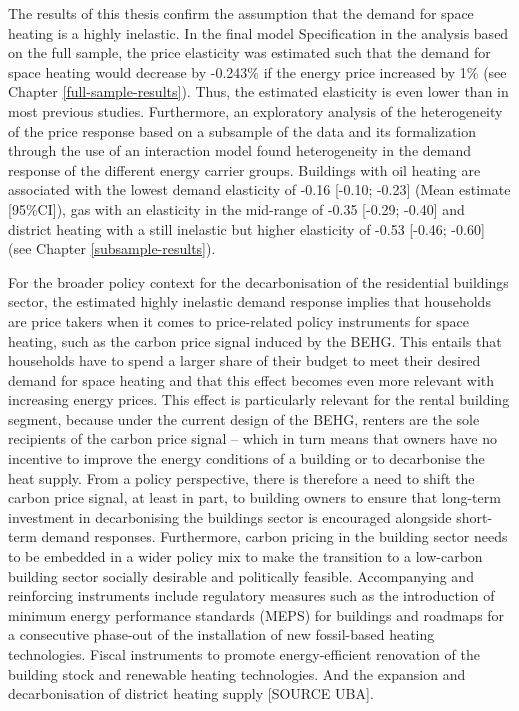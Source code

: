 \documentclass[12pt,twoside]{reedthesis}
\begin{document}
The results of this thesis confirm the assumption that the demand for space heating is a highly inelastic. In the final model Specification in the analysis based on the full sample, the price elasticity was estimated such that the demand for space heating would decrease by -0.243\% if the energy price increased by 1\% (see Chapter \ref{full-sample-results}). Thus, the estimated elasticity is even lower than in most previous studies. Furthermore, an exploratory analysis of the heterogeneity of the price response based on a subsample of the data and its formalization through the use of an interaction model found heterogeneity in the demand response of the different energy carrier groups. Buildings with oil heating are associated with the lowest demand elasticity of -0.16 {[}-0.10; -0.23{]} (Mean estimate {[}95\%CI{]}), gas with an elasticity in the mid-range of -0.35 {[}-0.29; -0.40{]} and district heating with a still inelastic but higher elasticity of -0.53 {[}-0.46; -0.60{]} (see Chapter \ref{subsample-results}).

For the broader policy context for the decarbonisation of the residential buildings sector, the estimated highly inelastic demand response implies that households are price takers when it comes to price-related policy instruments for space heating, such as the carbon price signal induced by the BEHG. This entails that households have to spend a larger share of their budget to meet their desired demand for space heating and that this effect becomes even more relevant with increasing energy prices. This effect is particularly relevant for the rental building segment, because under the current design of the BEHG, renters are the sole recipients of the carbon price signal -- which in turn means that owners have no incentive to improve the energy conditions of a building or to decarbonise the heat supply. From a policy perspective, there is therefore a need to shift the carbon price signal, at least in part, to building owners to ensure that long-term investment in decarbonising the buildings sector is encouraged alongside short-term demand responses. Furthermore, carbon pricing in the building sector needs to be embedded in a wider policy mix to make the transition to a low-carbon building sector socially desirable and politically feasible. Accompanying and reinforcing instruments include regulatory measures such as the introduction of minimum energy performance standards (MEPS) for buildings and roadmaps for a consecutive phase-out of the installation of new fossil-based heating technologies. Fiscal instruments to promote energy-efficient renovation of the building stock and renewable heating technologies. And the expansion and decarbonisation of district heating supply {[}SOURCE UBA{]}.
\end{document}
